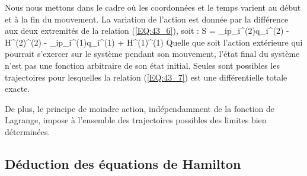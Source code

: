 Nous nous mettons dans le cadre o\`{u} les coordonn\'{e}es et le temps varient au d\'{e}but et \`{a} la fin du mouvement. La variation de l'action est donn\'{e}e par la diff\'{e}rence aux deux extremit\'{e}s de la relation (\ref{EQ:43_6}), soit :
\be
	S = \sum_{i}p_{i}^{(2)}q_{i}^{(2)} - H^{(2)}^{(2)} - \sum_{i}p_{i}^{(1)}q_{i}^{(1)} + H^{(1)}^{(1)} \label{EQ:43_7}
\ee
Quelle que soit l'action ext\'{e}rieure qui pourrait s'exercer sur le syst\`{e}me pendant son mouvement, l'\'{e}tat final du syst\`{e}me n'est pas une fonction arbitraire de son \'{e}tat initial. Seules sont possibles les trajectoires pour lesquelles la relation (\ref{EQ:43_7}) est une diff\'{e}rentielle totale exacte.

De plus, le principe de moindre action, ind\'{e}pendamment de la fonction de Lagrange, impose \`{a} l'ensemble des trajectoires possibles des limites bien d\'{e}termin\'{e}es.

\subsection{D\'{e}duction des \'{e}quations de Hamilton}

